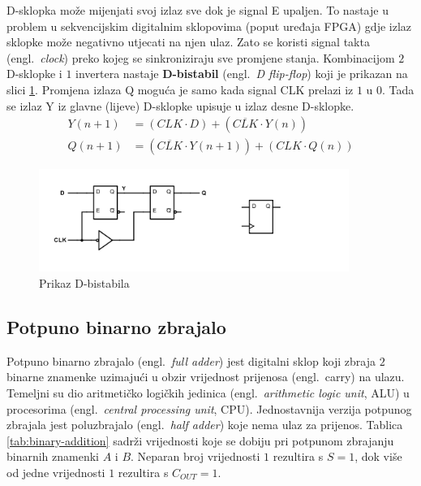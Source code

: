 \documentclass[times, utf8, diplomski]{fer}
\begin{document}
D-sklopka može mijenjati svoj izlaz sve dok je signal E upaljen. To nastaje u problem u sekvencijskim digitalnim sklopovima (poput uređaja FPGA) gdje izlaz sklopke može negativno utjecati na njen ulaz. Zato se koristi signal takta (engl.~\textit{clock}) preko kojeg se sinkroniziraju sve promjene stanja. Kombinacijom $2$ D-sklopke i $1$ invertera nastaje \textbf{D-bistabil} (engl.~\textit{D flip-flop}) koji je prikazan na slici \ref{fig:D-flip-flop}. Promjena izlaza Q moguća je samo kada signal CLK prelazi iz $1$ u $0$. Tada se izlaz Y iz glavne (lijeve) D-sklopke upisuje u izlaz desne D-sklopke.
%
\begin{align}
	Y(n+1) &= (CLK \cdot D) + (\overline{CLK} \cdot Y(n)) \\
	Q(n+1) &= (\overline{CLK} \cdot Y(n+1)) + (CLK \cdot Q(n))
\end{align}

\begin{figure}[htb]
	\centering
	\includegraphics[width=0.9\textwidth]{img/D_flip-flop_full.png}
	\caption{Prikaz D-bistabila}
	\label{fig:D-flip-flop}
\end{figure}

\subsection{Potpuno binarno zbrajalo} \label{subsec:adders}

Potpuno binarno zbrajalo (engl.~\textit{full adder}) jest digitalni sklop koji zbraja $2$ binarne znamenke uzimajući u obzir vrijednost prijenosa (engl.~carry) na ulazu. Temeljni su dio aritmetičko logičkih jedinica (engl.~\textit{arithmetic logic unit}, ALU) u procesorima (engl.~\textit{central processing unit}, CPU). Jednostavnija verzija potpunog zbrajala jest poluzbrajalo (engl.~\textit{half adder}) koje nema ulaz za prijenos. Tablica \ref{tab:binary-addition} sadrži vrijednosti koje se dobiju pri potpunom zbrajanju binarnih znamenki $A$ i $B$. Neparan broj vrijednosti $1$ rezultira s $S=1$, dok više od jedne vrijednosti $1$ rezultira s $C_{OUT}=1$.
\end{document}
